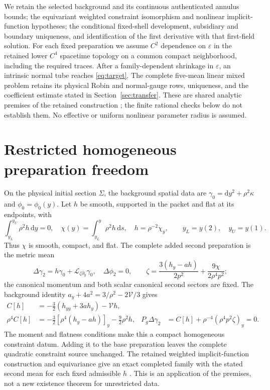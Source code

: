 \documentclass[11pt]{article}
\newcommand{\eps}{\varepsilon}
\newcommand{\dd}{\mathrm d}
\newcommand{\Lie}{\mathcal L}
\newcommand{\cV}{\mathcal V}
\begin{document}
We retain the selected background and its continuous authenticated annulus
bounds; the equivariant weighted constraint isomorphism and nonlinear
implicit-function hypotheses; the conditional fixed-shell development,
subsidiary and boundary uniqueness, and identification of the first
derivative with that first-field solution. For each fixed preparation we
assume $C^2$ dependence on $\eps$ in the retained lower $C^4$ spacetime
topology on a common compact neighborhood, including the required traces.
After a family-dependent shrinkage in $\eps$, an intrinsic normal tube
reaches \eqref{eq:target}. The complete five-mean linear mixed problem
retains its physical Robin and normal-gauge rows, uniqueness, and the
coefficient estimate stated in Section~\ref{sec:transfer}. These are shared
analytic premises of the retained construction \cite{records}; the finite
rational checks below do not establish them. No effective or uniform
nonlinear parameter radius is assumed.

\section{Restricted homogeneous preparation freedom}

On the physical initial section $\Sigma$, the background spatial data are
$\gamma_0=\dd y^2+\rho^2\kappa$ and $\phi_0=\phi_0(y)$. Let $h$ be smooth,
supported in the packet and flat at its endpoints, with
\begin{equation}
 \int_{y_L}^{y_U}\rho^2h\,\dd y=0,\quad
 \chi(y)=\int_{y_L}^{y}\rho^2h\,\dd s,\quad
 h=\rho^{-2}\chi_y,\qquad y_L=y(2),\quad y_U=y(1).
 \label{eq:admissible}
\end{equation}
Thus $\chi$ is smooth, compact, and flat. The complete added second
preparation is the metric mean
\begin{equation}
 \Delta\gamma_2=h\gamma_0+\Lie_{\zeta\partial_y}\gamma_0,
 \quad\Delta\phi_2=0,\qquad
 \zeta=\frac{3(h_y-ah)}{2p^2}+\frac{9\chi}{2\rho^4p^2};
 \label{eq:raw}
\end{equation}
the canonical momentum and both scalar canonical second sectors are fixed.
The background identity $a_y+4a^2=3/\rho^2-2\cV/3$ gives
\begin{align}
 C[h]&=-\tfrac32(h_{yy}+3ah_y)-\cV h,\nonumber\\
 \rho^4C[h]&=-\tfrac32[\rho^4(h_y-ah)]_y-\tfrac92\rho^2h,
 &P_g\Delta\gamma_2&=C[h]+\rho^{-4}(\rho^4p^2\zeta)_y=0.
 \label{eq:constraint}
\end{align}
The moment and flatness conditions make this a compact homogeneous
constraint datum. Adding it to the base preparation leaves the complete
quadratic constraint source unchanged. The retained weighted
implicit-function construction and equivariance give an exact completed
family with the stated second mean for each fixed admissible $h$
\cite{preparation}. This is an application of the premises, not a new
existence theorem for unrestricted data.
\end{document}
